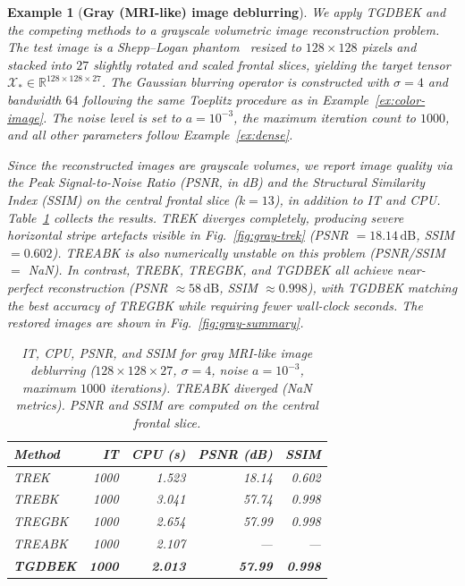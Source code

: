 \documentclass[11pt]{article}
\newtheorem{example}[theorem]{Example}
\def\fm#1{\mathcal{#1}}
\begin{document}
\begin{example}[\textbf{Gray (MRI-like) image deblurring}] \label{ex:gray}
We apply TGDBEK and the competing methods to a grayscale volumetric image reconstruction problem. The test image is a Shepp--Logan phantom~\cite{shepp1974fourier} resized to $128\times128$ pixels and stacked into $27$ slightly rotated and scaled frontal slices, yielding the target tensor $\fm X_\ast \in \mathbb{R}^{128\times128\times27}$. The Gaussian blurring operator is constructed with $\sigma=4$ and bandwidth $64$ following the same Toeplitz procedure as in Example~\ref{ex:color-image}. The noise level is set to $a=10^{-3}$, the maximum iteration count to $1000$, and all other parameters follow Example~\ref{ex:dense}.

Since the reconstructed images are grayscale volumes, we report image quality via the Peak Signal-to-Noise Ratio (PSNR, in dB) and the Structural Similarity Index (SSIM) on the central frontal slice ($k=13$), in addition to IT and CPU. Table~\ref{tab:ex5} collects the results. TREK diverges completely, producing severe horizontal stripe artefacts visible in Fig.~\ref{fig:gray-trek} (PSNR $= 18.14\,\mathrm{dB}$, SSIM $= 0.602$). TREABK is also numerically unstable on this problem (PSNR/SSIM $=$ NaN). In contrast, TREBK, TREGBK, and TGDBEK all achieve near-perfect reconstruction (PSNR $\approx 58\,\mathrm{dB}$, SSIM $\approx 0.998$), with TGDBEK matching the best accuracy of TREGBK while requiring fewer wall-clock seconds. The restored images are shown in Fig.~\ref{fig:gray-summary}.

\begin{table}[ht]
\centering\small\setlength{\tabcolsep}{5pt}
\begin{tabular}{lrrrr}
\toprule
Method & IT & CPU (s) & PSNR (dB) & SSIM \\
\midrule
TREK            & 1000 & 1.523 & 18.14 & 0.602 \\
TREBK           & 1000 & 3.041 & 57.74 & 0.998 \\
TREGBK          & 1000 & 2.654 & 57.99 & 0.998 \\
TREABK          & 1000 & 2.107 & ---   & ---   \\
\textbf{TGDBEK} & \textbf{1000} & \textbf{2.013} & \textbf{57.99} & \textbf{0.998} \\
\bottomrule
\end{tabular}
\caption{IT, CPU, PSNR, and SSIM for gray MRI-like image deblurring ($128\times128\times27$, $\sigma=4$, noise $a=10^{-3}$, maximum $1000$ iterations). TREABK diverged (NaN metrics). PSNR and SSIM are computed on the central frontal slice.}
\label{tab:ex5}
\end{table}
\end{example}
\end{document}
